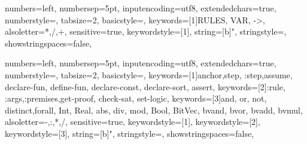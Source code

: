 

\lstset{style=mystyle}

{
  numbers=left,
  numbersep=5pt,
  inputencoding=utf8,
  extendedchars=true,
  numberstyle=\footnotesize,
  tabsize=2,
  basicstyle={\ttfamily\scriptsize\upshape},
  keywords=[1]{RULES, VAR, ->},
  alsoletter={*,/,+},
  sensitive=true,
  keywordstyle={[1]\bfseries\color{ForestGreen}},
  string=[b]{"},
  stringstyle=\color{orange},
  showstringspaces=false,
}

{
  numbers=left,
  numbersep=5pt,
  inputencoding=utf8,
  extendedchars=true,
  numberstyle=\footnotesize,
  tabsize=2,
  basicstyle={\ttfamily\scriptsize\upshape},
  keywords=[1]{anchor,step, :step,assume, declare-fun, define-fun, declare-const, declare-sort, assert},
  keywords=[2]{:rule, :args,:premises,get-proof, check-sat, set-logic},
  keywords=[3]{and, or, not, distinct,forall, Int, Real, abs, div, mod, Bool, BitVec, bvand, bvor, bvadd, bvmul},
  alsoletter={-,:,*,/},
  sensitive=true,
  keywordstyle={[1]\bfseries\color{mylpurple}},
  keywordstyle={[2]\bfseries\color{RoyalBlue}},
  keywordstyle={[3]\bfseries\color{mypurple}},
  string=[b]{"},
  stringstyle=\color{orange},
  showstringspaces=false,
}

\newcommand{\sub}[1]{\ensuremath{_{\!#1}}}


